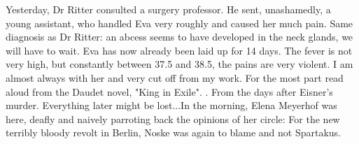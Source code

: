 
Yesterday, Dr Ritter consulted a surgery professor. He sent, unashamedly, a young assistant, who handled Eva very roughly and caused her much pain. Same diagnosis as Dr Ritter: an abcess seems to have developed in the neck glands, we will have to wait. Eva has now already been laid up for 14 days. The fever is not very high, but constantly between 37.5 and 38.5, the pains are  very violent. I am almost always with her and very cut off from my work. For the most part read aloud from the  Daudet novel, "King in Exile". \missing {} . From the days after Eisner's murder. Everything later might be lost...In the morning, Elena Meyerhof was here, deafly and naively parroting back the opinions of her circle: For the new terribly bloody revolt in Berlin, Noske was again to blame and not Spartakus.

\missing

